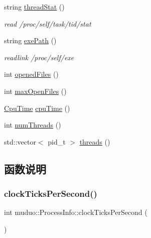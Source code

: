 \begin{DoxyCompactItemize}
string \hyperlink{namespacemuduo_1_1ProcessInfo_a7d3faa2d63f4cf7b8ba073a3daf7ffb1}{thread\+Stat} ()
\begin{DoxyCompactList}\small\item\em read /proc/self/task/tid/stat \end{DoxyCompactList}\item 
string \hyperlink{namespacemuduo_1_1ProcessInfo_acdf231e7f033258ea9e93f1a4d651c50}{exe\+Path} ()
\begin{DoxyCompactList}\small\item\em readlink /proc/self/exe \end{DoxyCompactList}\item 
int \hyperlink{namespacemuduo_1_1ProcessInfo_aa8e6192d04097a3864d8c07bf24e4ff9}{opened\+Files} ()
\item 
int \hyperlink{namespacemuduo_1_1ProcessInfo_a2bb52b7cbab50f7bc977048005845c67}{max\+Open\+Files} ()
\item 
\hyperlink{structmuduo_1_1ProcessInfo_1_1CpuTime}{Cpu\+Time} \hyperlink{namespacemuduo_1_1ProcessInfo_a0e67cc8ad47ff86331b6d2a509d14648}{cpu\+Time} ()
\item 
int \hyperlink{namespacemuduo_1_1ProcessInfo_a120db223841da7c65566c1fb2a06befa}{num\+Threads} ()
\item 
std\+::vector$<$ pid\+\_\+t $>$ \hyperlink{namespacemuduo_1_1ProcessInfo_a360aafb2759971d7c8190b1a60f7dc03}{threads} ()
\end{DoxyCompactItemize}


\subsection{函数说明}
\mbox{\label{namespacemuduo_1_1ProcessInfo_af8d3ce061f87c1a208c8e164e9b69882}} 
\subsubsection{\texorpdfstring{clock\+Ticks\+Per\+Second()}{clockTicksPerSecond()}}
{\footnotesize\ttfamily int muduo\+::\+Process\+Info\+::clock\+Ticks\+Per\+Second (\begin{DoxyParamCaption}{ }\end{DoxyParamCaption})}

